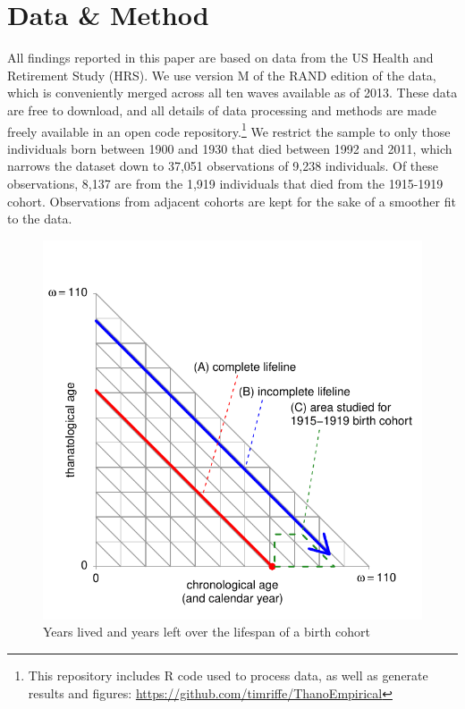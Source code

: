 \documentclass[11pt,oneside]{article} %
\begin{document}
\section*{Data \& Method}

All findings reported in this paper are based on data from the US Health and
Retirement Study (HRS). We use version M of the RAND edition of the data, which
is conveniently merged across all ten waves available as of 2013.
These data are free to download, and all details of data processing and methods are made freely available in an open code
repository.\footnote{This
repository includes R code used to process data, as well as generate results and
figures: \url{https://github.com/timriffe/ThanoEmpirical}}
We restrict the sample to only those
individuals born between 1900 and 1930 that died between 1992 and 2011, which
narrows the dataset down to 37,051 observations of 9,238 individuals. Of
these observations, 8,137 are from the 1,919 individuals that died from the
1915-1919 cohort. Observations from adjacent cohorts are kept for the sake of a
smoother fit to the data.
%
\begin{figure}[!h]
\centering
\caption{Years lived and years left over the lifespan of a birth cohort}
\label{fig:LexisOrtho}
	\includegraphics{Figures/LexisOrtho.pdf}
\end{figure}
\end{document}
